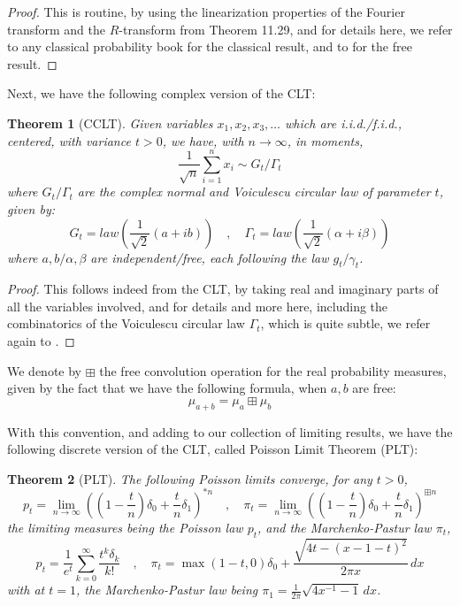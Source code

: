 \documentclass[12pt]{amsbook}
\newtheorem{theorem}{Theorem}[chapter]
\begin{document}
\begin{proof}
This is routine, by using the linearization properties of the Fourier transform and the $R$-transform from Theorem 11.29, and for details here, we refer to any classical probability book for the classical result, and to \cite{vdn} for the free result.
\end{proof}

Next, we have the following complex version of the CLT:

\begin{theorem}[CCLT]
Given variables $x_1,x_2,x_3,\ldots$ which are i.i.d./f.i.d., centered, with variance $t>0$, we have, with $n\to\infty$, in moments,
$$\frac{1}{\sqrt{n}}\sum_{i=1}^nx_i\sim G_t/\Gamma_t$$
where $G_t/\Gamma_t$ are the complex normal and Voiculescu circular law of parameter $t$, given by:
$$G_t=law\left(\frac{1}{\sqrt{2}}(a+ib)\right)\quad,\quad 
\Gamma_t=law\left(\frac{1}{\sqrt{2}}(\alpha+i\beta)\right)$$
where $a,b/\alpha,\beta$ are independent/free, each following the law $g_t/\gamma_t$.
\end{theorem}

\begin{proof}
This follows indeed from the CLT, by taking real and imaginary parts of all the variables involved, and for details and more here, including the combinatorics of the Voiculescu circular law $\Gamma_t$, which is quite subtle, we refer again to \cite{vdn}.
\end{proof}

We denote by $\boxplus$ the free convolution operation for the real probability measures, given by the fact that we have the following formula, when $a,b$ are free:
$$\mu_{a+b}=\mu_a\boxplus\mu_b$$

With this convention, and adding to our collection of limiting results, we have the following discrete version of the CLT, called Poisson Limit Theorem (PLT):

\begin{theorem}[PLT]
The following Poisson limits converge, for any $t>0$,
$$p_t=\lim_{n\to\infty}\left(\left(1-\frac{t}{n}\right)\delta_0+\frac{t}{n}\delta_1\right)^{*n}\quad,\quad 
\pi_t=\lim_{n\to\infty}\left(\left(1-\frac{t}{n}\right)\delta_0+\frac{t}{n}\delta_1\right)^{\boxplus n}$$
the limiting measures being the Poisson law $p_t$, and the Marchenko-Pastur law $\pi_t$,
$$p_t=\frac{1}{e^t}\sum_{k=0}^\infty\frac{t^k\delta_k}{k!}\quad,\quad 
\pi_t=\max(1-t,0)\delta_0+\frac{\sqrt{4t-(x-1-t)^2}}{2\pi x}\,dx$$
with at $t=1$, the Marchenko-Pastur law being $\pi_1=\frac{1}{2\pi}\sqrt{4x^{-1}-1}\,dx$. 
\end{theorem}
\end{document}
